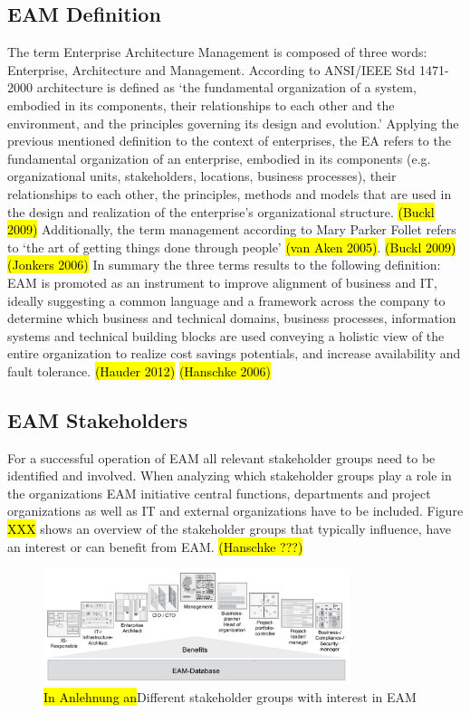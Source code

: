 \subsection{EAM Definition}
The term Enterprise Architecture Management is composed of three words: Enterprise, Architecture and Management.
According to ANSI/IEEE Std 1471-2000 architecture is defined as ‘the fundamental organization of a system, embodied in its components, their relationships to each other and the environment, and the principles governing its design and evolution.’
Applying the previous mentioned definition to the context of enterprises, the EA refers to the fundamental organization of an enterprise, embodied in its components (e.g. organizational units, stakeholders, locations, business processes), their relationships to each other, the principles, methods and models that are used in the design and realization of the enterprise’s organizational structure.
\hl{(Buckl 2009)}
Additionally, the term management according to Mary Parker Follet refers to ‘the art of getting things done through people’ \hl{(van Aken 2005)}.
\hl{(Buckl 2009)}
\hl{(Jonkers 2006)}
In summary the three terms results to the following definition: EAM is promoted as an instrument to improve alignment of business and IT, ideally suggesting a common language and a framework across the company to determine  which business and technical domains, business processes, information systems and technical building blocks are used conveying a holistic view of the entire organization to realize cost savings potentials, and increase availability and fault tolerance.
\hl{(Hauder 2012)}
\hl{(Hanschke 2006)}

\subsection{EAM Stakeholders}
For a successful operation of EAM all relevant stakeholder groups need to be identified and involved.
When analyzing which stakeholder groups play a role in the organizations EAM initiative central functions, departments and project organizations as well as IT and external organizations have to be included. 
Figure \hl{XXX} shows an overview of the stakeholder groups that typically influence, have an interest or can benefit from EAM. \hl{(Hanschke ???)}
\begin{figure}[htpb]
  \centering
  \includegraphics[width=0.8\textwidth]{figures/eam-stakeholder.png}
  \caption{ \hl{In Anlehnung an}Different stakeholder groups with interest in EAM~\parencite{Hanschke 2013}}
  \label{fig:Differet stakeholder groups with interenst in EAM}
\end{figure}

